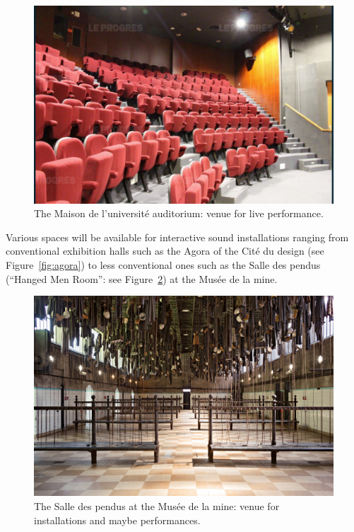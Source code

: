 \documentclass[fontsize=12pt]{scrartcl} %
\numberwithin{equation}{section} %
\numberwithin{figure}{section} %
\numberwithin{table}{section} %
\begin{document}
\begin{figure}[htpb]
\begin{center}
\includegraphics[scale=0.3]{img/mume.jpg}
\caption{The Maison de l'université auditorium: venue for live performance.}
\label{fig:mume}
\end{center}
\end{figure}

Various spaces will be available for interactive sound installations ranging from conventional exhibition halls such as the Agora of the Cité du design (see Figure~\ref{fig:agora}) to less conventional ones such as the Salle des pendus (``Hanged Men Room'': see Figure~\ref{fig:pendus}) at the Musée de la mine. 

\begin{figure}[htpb]
\begin{center}
\includegraphics[scale=0.2]{img/pendus.jpg}
\caption{The Salle des pendus at the Musée de la mine: venue for installations and maybe performances.}
\label{fig:pendus}
\end{center}
\end{figure}
\end{document}
